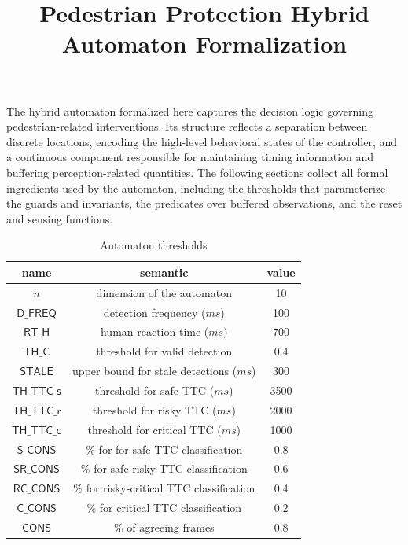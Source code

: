 \documentclass[journal]{IEEEtran}
\theoremstyle{definition}
\theoremstyle{property}
\newcommand{\thr}[1]{\mathsf{#1}}
\begin{document}
\title{Pedestrian Protection Hybrid Automaton Formalization}


\maketitle



The hybrid automaton formalized here captures the decision logic governing pedestrian-related interventions. Its structure reflects a separation between discrete locations, encoding the high-level behavioral states of the controller, and a continuous component responsible for maintaining timing information and buffering perception-related quantities. The following sections collect all formal ingredients used by the automaton, including the thresholds that parameterize the guards and invariants, the predicates over buffered observations, and the reset and sensing functions.

\begin{table}[h!]
\caption{Automaton thresholds}
\setlength{\tabcolsep}{8pt}
\renewcommand{\arraystretch}{1.3}
\begin{tabular}{|c|c|c|}
\hline
{\bf name} & {\bf semantic}  & {\bf value}\\
\hline
$n$   &    dimension of the automaton & 10       \\
\hline
$\thr{D\_FREQ}$   &    detection frequency ($ms$) & 100      \\
\hline
$\thr{RT\_H}$     &    human reaction time ($ms)$ & 700\\      \hline
$\thr{TH\_C}$  &  threshold for valid detection  & 0.4       \\\hline
$\thr{STALE}$  &   upper bound for stale detections ($ms$) & 300        \\\hline
$\thr{TH\_TTC\_s}$ &   threshold for safe TTC ($ms$) & 3500        \\\hline
$\thr{TH\_TTC\_r}$ &   threshold for risky TTC ($ms$) & 2000      \\\hline
$\thr{TH\_TTC\_c}$ &   threshold for critical TTC ($ms$) & 1000       \\\hline
$\thr{S\_CONS}$ &  \% for for safe TTC classification  & 0.8       \\\hline
$\thr{SR\_CONS}$ &  \% for safe-risky TTC classification & 0.6         \\\hline
$\thr{RC\_CONS}$ &  \% for risky-critical TTC classification & 0.4        \\\hline
$\thr{C\_CONS}$ &  \% for critical TTC classification & 0.2       \\\hline
$\thr{CONS}$ &  \% of agreeing frames & 0.8  \\\hline  
\end{tabular}
\label{tab:thr}
\end{table}
\end{document}
